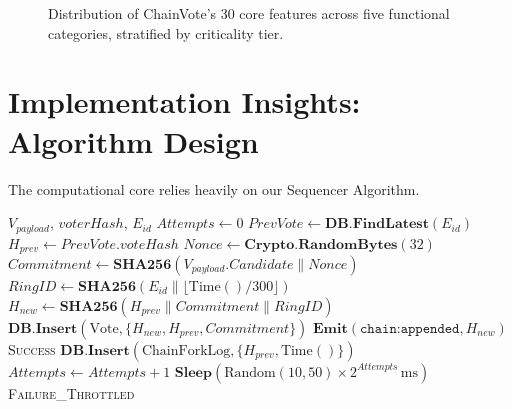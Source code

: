 \documentclass[journal,10pt,twocolumn]{IEEEtran}
\begin{document}
\begin{figure}[htbp]
\centering
{}
\caption{Distribution of ChainVote's 30 core features across five functional categories, stratified by criticality tier.}
\label{fig:feature_taxonomy}
\end{figure}

\section{Implementation Insights: Algorithm Design}

The computational core relies heavily on our Sequencer Algorithm.

\begin{algorithm}[H]
\caption{The Vote Caster \& Fork Resolver Protocol}
\begin{algorithmic}[1]
\REQUIRE $V_{payload}$, $voterHash$, $E_{id}$
\STATE $Attempts \gets 0$
    \STATE $PrevVote \leftarrow \textbf{DB.FindLatest}(E_{id})$
    \STATE $H_{prev} \leftarrow PrevVote.voteHash$
    \STATE $Nonce \leftarrow \textbf{Crypto.RandomBytes}(32)$
    \STATE $Commitment \leftarrow \textbf{SHA256}(V_{payload}.Candidate \parallel Nonce)$
    \STATE $RingID \leftarrow \textbf{SHA256}(E_{id} \parallel \lfloor \text{Time}() / 300 \rfloor)$
    \STATE $H_{new} \leftarrow \textbf{SHA256}(H_{prev} \parallel Commitment \parallel RingID)$
    \TRY
        \STATE $\textbf{DB.Insert}(\text{Vote}, \{H_{new}, H_{prev}, Commitment\})$
        \STATE $\textbf{Emit}(\texttt{chain:appended}, H_{new})$
        \RETURN \textsc{Success}
        \STATE $\textbf{DB.Insert}(\text{ChainForkLog}, \{H_{prev}, \text{Time}()\})$
        \STATE $Attempts \gets Attempts + 1$
        \STATE $\textbf{Sleep}(\text{Random}(10, 50) \times 2^{Attempts}\,\mathrm{ms})$
    \ENDTRY
\ENDWHILE
\RETURN \textsc{Failure\_Throttled}
\end{algorithmic}
\end{algorithm}
\end{document}
